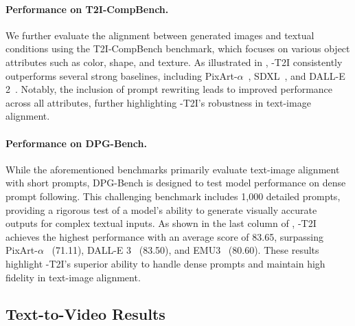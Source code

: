 \paragraph{Performance on T2I-CompBench.} We further evaluate the alignment between generated images and textual conditions using the T2I-CompBench benchmark, which focuses on various object attributes such as color, shape, and texture. As illustrated in , \ours-T2I consistently outperforms several strong baselines, including PixArt-$\alpha$~\citep{chen2023pixart}, SDXL~\citep{podell2023sdxl}, and DALL-E 2~\citep{mishkin2022dall}. Notably, the inclusion of prompt rewriting leads to improved performance across all attributes, further highlighting \ours-T2I's robustness in text-image alignment.

\paragraph{Performance on DPG-Bench.} While the aforementioned benchmarks primarily evaluate text-image alignment with short prompts, DPG-Bench is designed to test model performance on dense prompt following. This challenging benchmark includes 1,000 detailed prompts, providing a rigorous test of a model's ability to generate visually accurate outputs for complex textual inputs. As shown in the last column of , \ours-T2I achieves the highest performance with an average score of 83.65, surpassing PixArt-$\alpha$~\citep{chen2023pixart} (71.11), DALL-E 3~\citep{betker2023improving} (83.50), and EMU3~\citep{wang2024emu3} (80.60). These results highlight \ours-T2I's superior ability to handle dense prompts and maintain high fidelity in text-image alignment.

\subsection{Text-to-Video Results}


